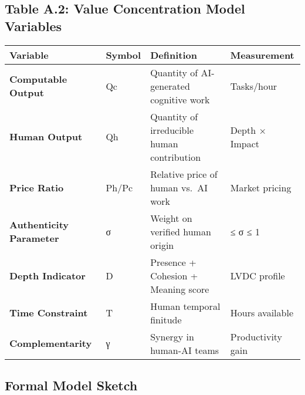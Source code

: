 \documentclass[
  a4paper,
]{report}
\begin{document}
\subsection{Table A.2: Value Concentration Model
Variables}\label{table-a.2-value-concentration-model-variables}

\begin{longtable}[]{@{}
  >{\raggedright\arraybackslash}p{}
  >{\raggedright\arraybackslash}p{}
  >{\raggedright\arraybackslash}p{}
  >{\raggedright\arraybackslash}p{}@{}}
\toprule\noalign{}
\begin{minipage}[b]{\linewidth}\raggedright
Variable
\end{minipage} & \begin{minipage}[b]{\linewidth}\raggedright
Symbol
\end{minipage} & \begin{minipage}[b]{\linewidth}\raggedright
Definition
\end{minipage} & \begin{minipage}[b]{\linewidth}\raggedright
Measurement
\end{minipage} \\
\midrule\noalign{}
\endhead
\bottomrule\noalign{}
\endlastfoot
\textbf{Computable Output} & Qc & Quantity of AI-generated cognitive
work & Tasks/hour \\
\textbf{Human Output} & Qh & Quantity of irreducible human contribution
& Depth × Impact \\
\textbf{Price Ratio} & Ph/Pc & Relative price of human vs.~AI work &
Market pricing \\
\textbf{Authenticity Parameter} & σ & Weight on verified human origin &
0 ≤ σ ≤ 1 \\
\textbf{Depth Indicator} & D & Presence + Cohesion + Meaning score &
LVDC profile \\
\textbf{Time Constraint} & T & Human temporal finitude & Hours
available \\
\textbf{Complementarity} & γ & Synergy in human-AI teams & Productivity
gain \\
\end{longtable}

\subsection{Formal Model Sketch}\label{formal-model-sketch}
\end{document}
